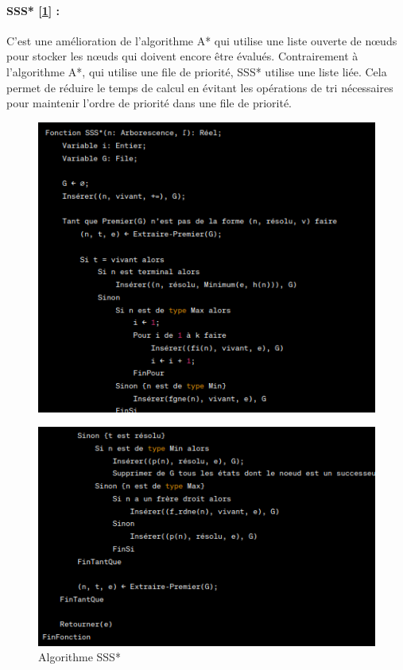 \documentclass[12pt]{article}
\begin{document}
	\paragraph{SSS* [\ref{Algorithme SSS*}] :} C'est une amélioration de l'algorithme A* qui utilise une liste ouverte de nœuds pour stocker les nœuds qui doivent encore être évalués. Contrairement à l'algorithme A*, qui utilise une file de priorité, SSS* utilise une liste liée. Cela permet de réduire le temps de calcul en évitant les opérations de tri nécessaires pour maintenir l'ordre de priorité dans une file de priorité.
	
		\begin{figure}[H]
		\centering
		\includegraphics[scale=0.7]{img/sss1}
	\end{figure}
		\begin{figure}[H]
		\centering
		\includegraphics[scale=0.7]{img/sss2}
		\caption{Algorithme SSS* }
		\label{Algorithme SSS*}
	\end{figure}
	
\end{document}
